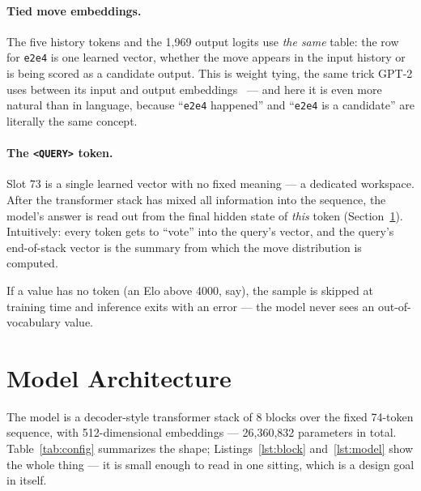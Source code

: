 \documentclass[10pt,a4paper]{article}
\newcommand{\code}[1]{\texttt{#1}}
\begin{document}
\paragraph{Tied move embeddings.} The five history tokens and the 1{,}969
output logits use \emph{the same} table: the row for \code{e2e4} is one
learned vector, whether the move appears in the input history or is being
scored as a candidate output. This is weight tying, the same trick GPT-2
uses between its input and output embeddings~\cite{gpt2} --- and here it
is even more natural than in language, because ``\code{e2e4} happened''
and ``\code{e2e4} is a candidate'' are literally the same concept.

\paragraph{The \texttt{<QUERY>} token.} Slot 73 is a single learned
vector with no fixed meaning --- a dedicated workspace. After the
transformer stack has mixed all information into the sequence, the
model's answer is read out from the final hidden state of \emph{this}
token (Section~\ref{sec:arch}). Intuitively: every token gets to ``vote''
into the query's vector, and the query's end-of-stack vector is the
summary from which the move distribution is computed.

If a value has no token (an Elo above 4000, say), the sample is skipped
at training time and inference exits with an error --- the model never
sees an out-of-vocabulary value.

\section{Model Architecture}\label{sec:arch}

The model is a decoder-style transformer stack of 8 blocks over the fixed
74-token sequence, with 512-dimensional embeddings --- 26{,}360{,}832
parameters in total. Table~\ref{tab:config} summarizes the shape;
Listings~\ref{lst:block} and~\ref{lst:model} show the whole thing --- it
is small enough to read in one sitting, which is a design goal in itself.
\end{document}
